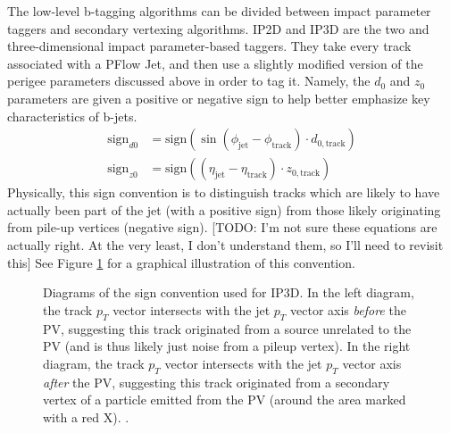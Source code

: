             The low-level b-tagging algorithms can be divided between impact parameter taggers and secondary vertexing algorithms.
            IP2D and IP3D are the two and three-dimensional impact parameter-based taggers.
            They take every track associated with a PFlow Jet,
                and then use a slightly modified version of the perigee parameters discussed above in order to tag it.
            Namely, the $d_0$ and $z_0$ parameters are given a positive or negative sign to help better emphasize key characteristics of b-jets\cite{thesis_giacinto}.
            \begin{equation} \begin{split}
                \textrm{sign}_{d0} &= \textrm{sign}(\sin(\phi_{\textrm{jet}} - \phi_{\textrm{track}}) \cdot d_{0,\textrm{track}}) \\
                \textrm{sign}_{z0} &= \textrm{sign}((\eta_{\textrm{jet}} - \eta_{\textrm{track}}) \cdot z_{0,\textrm{track}})
            \end{split} \end{equation}
            Physically, this sign convention is to distinguish tracks which are likely to have actually been part of the jet (with a positive sign)
                from those likely originating from pile-up vertices (negative sign).
            [TODO: I'm not sure these equations are actually right. At the very least, I don't understand them, so I'll need to revisit this]
            See Figure \ref{fig:ip3d_sign} for a graphical illustration of this convention.

            \begin{figure}
                \caption{
                    Diagrams of the sign convention used for IP3D.
                    In the left diagram, the track $p_T$ vector intersects with the jet $p_T$ vector axis
                        \textit{before} the PV, suggesting this track originated from a source unrelated to the PV
                        (and is thus likely just noise from a pileup vertex).
                    In the right diagram, the track $p_T$ vector intersects with the jet $p_T$ vector axis
                        \textit{after} the PV, suggesting this track originated from a secondary vertex of
                        a particle emitted from the PV
                        (around the area marked with a red X).
                    \cite{thesis_giacinto}.
                }
                \label{fig:ip3d_sign}
            \end{figure}

